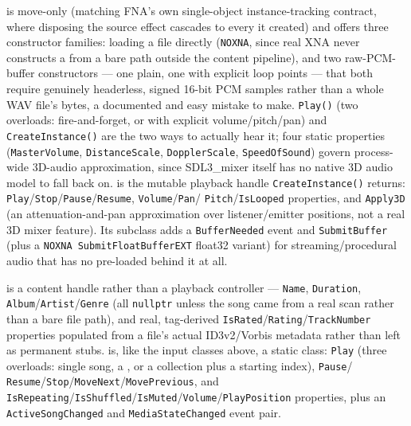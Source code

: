  is move-only (matching FNA's own single-object instance-tracking
contract, where disposing the source effect cascades to every  it
created) and offers three constructor families: loading a file directly
(\texttt{NOXNA}, since real XNA never constructs a  from a bare path
outside the content pipeline), and two raw-PCM-buffer constructors --- one plain, one with
explicit loop points --- that both require genuinely headerless, signed 16-bit PCM samples
rather than a whole WAV file's bytes, a documented and easy mistake to make. \texttt{Play()}
(two overloads: fire-and-forget, or with explicit volume/pitch/pan) and \texttt{CreateInstance()}
are the two ways to actually hear it; four static properties (\texttt{MasterVolume},
\texttt{DistanceScale}, \texttt{DopplerScale}, \texttt{SpeedOfSound}) govern process-wide 3D-audio
approximation, since SDL3\_mixer itself has no native 3D audio model to fall back on.
 is the mutable playback handle \texttt{CreateInstance()} returns:
\texttt{Play}/\texttt{Stop}/\texttt{Pause}/\texttt{Resume}, \texttt{Volume}/\texttt{Pan}/%
\texttt{Pitch}/\texttt{IsLooped} properties, and \texttt{Apply3D} (an attenuation-and-pan
approximation over listener/emitter positions, not a real 3D mixer feature). Its subclass
 adds a \texttt{BufferNeeded} event and
\texttt{SubmitBuffer} (plus a \texttt{NOXNA SubmitFloatBufferEXT} float32 variant) for
streaming/procedural audio that has no pre-loaded  behind it at all.

 is a content handle rather than a playback controller --- \texttt{Name},
\texttt{Duration}, \texttt{Album}/\texttt{Artist}/\texttt{Genre} (all \texttt{nullptr} unless the
song came from a real  scan rather than a bare file path), and real,
tag-derived \texttt{IsRated}/\texttt{Rating}/\texttt{TrackNumber} properties populated from a
file's actual ID3v2/Vorbis metadata rather than left as permanent stubs. 
is, like the input classes above, a static class: \texttt{Play} (three overloads: single song,
a , or a collection plus a starting index), \texttt{Pause}/%
\texttt{Resume}/\texttt{Stop}/\texttt{MoveNext}/\texttt{MovePrevious}, and
\texttt{IsRepeating}/\texttt{IsShuffled}/\texttt{IsMuted}/\texttt{Volume}/\texttt{PlayPosition}
properties, plus an \texttt{ActiveSongChanged} and \texttt{MediaStateChanged} event pair.


